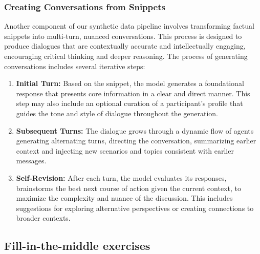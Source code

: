 \documentclass[11pt]{article}
\begin{document}
\subsubsection{Creating Conversations from Snippets}
Another component of our synthetic data pipeline involves transforming factual snippets into multi-turn, nuanced conversations. This process is designed to produce dialogues that are contextually accurate and intellectually engaging, encouraging critical thinking and deeper reasoning.
The process of generating conversations includes several iterative steps:
\begin{enumerate}
    \item \textbf{Initial Turn:} Based on the snippet, the model generates a foundational response that presents core information in a clear and direct manner. This step may also include an optional curation of a participant's profile that guides the tone and style of dialogue throughout the generation.
    \item \textbf{Subsequent Turns:} The dialogue grows through a dynamic flow of agents generating alternating turns, directing the conversation, summarizing earlier context and injecting new scenarios and topics consistent with earlier messages.
    \item \textbf{Self-Revision:} After each turn, the model evaluates its responses, brainstorms the best next course of action given the current context, to maximize the complexity and nuance of the discussion. This includes suggestions for exploring alternative perspectives or creating connections to broader contexts.
\end{enumerate}

\subsection{Fill-in-the-middle exercises}
\end{document}
